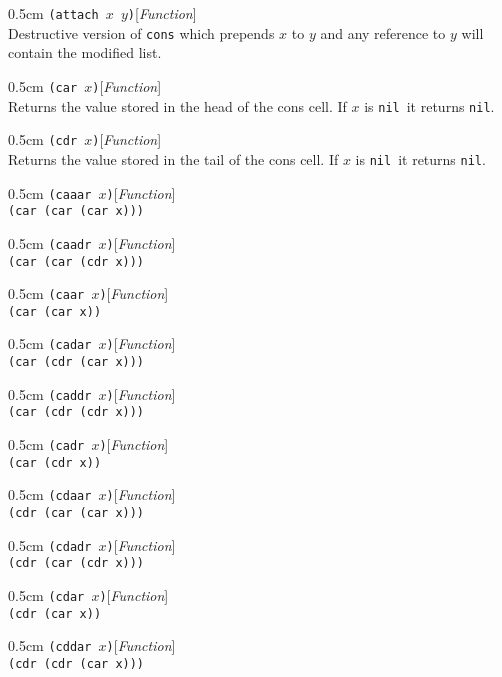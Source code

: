 \documentclass[a4paper]{article}
\newcommand{\lisp}[1]{\texttt{#1}}
\newcommand{\NIL}{\lisp{nil}}
\newenvironment{defun}[2]{\begin{adjustwidth}{0.5cm}{}
    {\hspace*{-0.5cm}\lisp{#2}\hfill[\textit{#1}]\\}}
               {\end{adjustwidth}}
\begin{document}
\begin{defun}{Function}{(attach $x$ $y$)}
  Destructive version of \lisp{cons} which prepends $x$ to $y$ and any
  reference to $y$ will contain the modified list.
\end{defun}

\begin{defun}{Function}{(car $x$)}
  Returns the value stored in the head of the cons cell. If $x$ is
  \NIL\ it returns \NIL.
\end{defun}

\begin{defun}{Function}{(cdr $x$)}
  Returns the value stored in the tail of the cons cell. If $x$ is
  \NIL\ it returns \NIL.
\end{defun}


\begin{defun}{Function}{(caaar $x$)}
  \lisp{(car (car (car x)))}
\end{defun}

\begin{defun}{Function}{(caadr $x$)}
  \lisp{(car (car (cdr x)))}
\end{defun}

\begin{defun}{Function}{(caar $x$)}
  \lisp{(car (car x))}
\end{defun}

\begin{defun}{Function}{(cadar $x$)}
  \lisp{(car (cdr (car x)))}
\end{defun}

\begin{defun}{Function}{(caddr $x$)}
  \lisp{(car (cdr (cdr x)))}
\end{defun}

\begin{defun}{Function}{(cadr $x$)}
  \lisp{(car (cdr x))}
\end{defun}

\begin{defun}{Function}{(cdaar $x$)}
  \lisp{(cdr (car (car x)))}
\end{defun}

\begin{defun}{Function}{(cdadr $x$)}
  \lisp{(cdr (car (cdr x)))}
\end{defun}

\begin{defun}{Function}{(cdar $x$)}
  \lisp{(cdr (car x))}
\end{defun}

\begin{defun}{Function}{(cddar $x$)}
  \lisp{(cdr (cdr (car x)))}
\end{defun}
\end{document}
